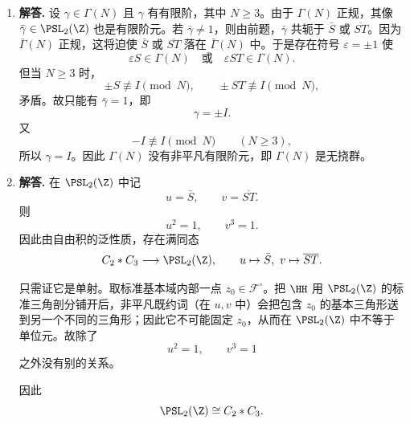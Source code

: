 \begin{enumerate}[label=\textbf{\arabic*.}, leftmargin=*, itemsep=1em]
若 $c\neq0$，任取 $d\in\F_q$，则
\[
b=(ad-1)c^{-1}
\]
唯一确定；

若 $c=0$，则 $a\neq0$，任取 $b\in\F_q$，而
\[
d=a^{-1}
\]
唯一确定。

所以每个非零第一列对应恰好 $q$ 个第二列，故
\[
|\SL_2(\F_q)|=(q^2-1)\cdot q=q(q^2-1).
\]

\item \textbf{解答.} 设 $\gamma\in\Gamma(N)$ 且 $\gamma$ 有有限阶，其中 $N\ge 3$。由于 $\Gamma(N)$ 正规，其像 $\bar\gamma\in\PSL_2(\Z)$ 也是有限阶元。若 $\bar\gamma\neq 1$，则由前题，$\bar\gamma$ 共轭于 $\bar S$ 或 $\overline{ST}$。因为 $\bar\Gamma(N)$ 正规，这将迫使 $\bar S$ 或 $\overline{ST}$ 落在 $\bar\Gamma(N)$ 中。于是存在符号 $\varepsilon=\pm1$ 使
\[
\varepsilon S\in \Gamma(N)\quad\text{或}\quad \varepsilon ST\in \Gamma(N).
\]
但当 $N\ge3$ 时，
\[
\pm S\not\equiv I\pmod N,\qquad \pm ST\not\equiv I\pmod N,
\]
矛盾。故只能有 $\bar\gamma=1$，即
\[
\gamma=\pm I.
\]
又
\[
-I\not\equiv I\pmod N \qquad (N\ge3),
\]
所以 $\gamma=I$。因此 $\Gamma(N)$ 没有非平凡有限阶元，即 $\Gamma(N)$ 是无挠群。

\item \textbf{解答.} 在 $\PSL_2(\Z)$ 中记
\[
u=\bar S,\qquad v=\overline{ST}.
\]
则
\[
u^2=1,\qquad v^3=1.
\]
因此由自由积的泛性质，存在满同态
\[
C_2*C_3\longrightarrow \PSL_2(\Z),\qquad
u\mapsto \bar S,\ v\mapsto \overline{ST}.
\]

只需证它是单射。取标准基本域内部一点 $z_0\in\mathcal F^\circ$。把 $\HH$ 用 $\PSL_2(\Z)$ 的标准三角剖分铺开后，非平凡既约词（在 $u,v$ 中）会把包含 $z_0$ 的基本三角形送到另一个不同的三角形；因此它不可能固定 $z_0$，从而在 $\PSL_2(\Z)$ 中不等于单位元。故除了
\[
u^2=1,\qquad v^3=1
\]
之外没有别的关系。

因此
\[
\PSL_2(\Z)\cong C_2*C_3.
\]
\end{enumerate}
